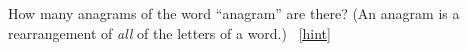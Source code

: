 \documentclass{book}
\begin{document}
\setcounter{project}{115}
\addtocounter{project}{-1}
\begin{activity}[]\label{activity-108}
\hypertarget{p-826}{}%
How many anagrams of the word ``anagram'' are there? (An anagram is a rearrangement of \emph{all} of the letters of a word.)%
~\hfill{\tiny\hyperlink{a-115}{[hint]}\hypertarget{q-115}{}}\end{activity}
\end{document}
